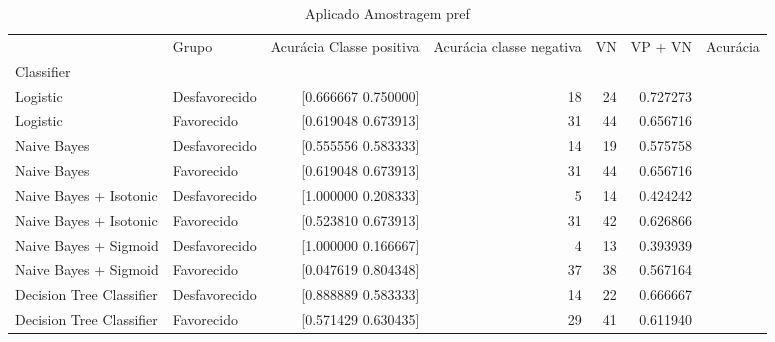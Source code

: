 \begin{table}
    \centering
    \caption{Aplicado Amostragem pref}
    \label{Aplicado Amostragem pref 5}
    \begin{tabular}{llrrrrr}
    \toprule
    {} &          Grupo &  Acurácia Classe positiva &  Acurácia classe negativa &  VN  &  VP + VN  &  Acurácia \\
    Classifier               &                &                           &                           &      &           &           \\
    \midrule
    Logistic                 &  Desfavorecido &                  [0.666667  0.750000] &   18 &        24 &  0.727273 \\
    Logistic                 &     Favorecido &                  [0.619048  0.673913] &   31 &        44 &  0.656716 \\
    Naive Bayes              &  Desfavorecido &                  [0.555556  0.583333] &   14 &        19 &  0.575758 \\
    Naive Bayes              &     Favorecido &                  [0.619048  0.673913] &   31 &        44 &  0.656716 \\
    Naive Bayes + Isotonic   &  Desfavorecido &                  [1.000000  0.208333] &    5 &        14 &  0.424242 \\
    Naive Bayes + Isotonic   &     Favorecido &                  [0.523810  0.673913] &   31 &        42 &  0.626866 \\
    Naive Bayes + Sigmoid    &  Desfavorecido &                  [1.000000  0.166667] &    4 &        13 &  0.393939 \\
    Naive Bayes + Sigmoid    &     Favorecido &                  [0.047619  0.804348] &   37 &        38 &  0.567164 \\
    Decision Tree Classifier &  Desfavorecido &                  [0.888889  0.583333] &   14 &        22 &  0.666667 \\
    Decision Tree Classifier &     Favorecido &                  [0.571429  0.630435] &   29 &        41 &  0.611940 \\
    \bottomrule
    \end{tabular}
\end{table}
    